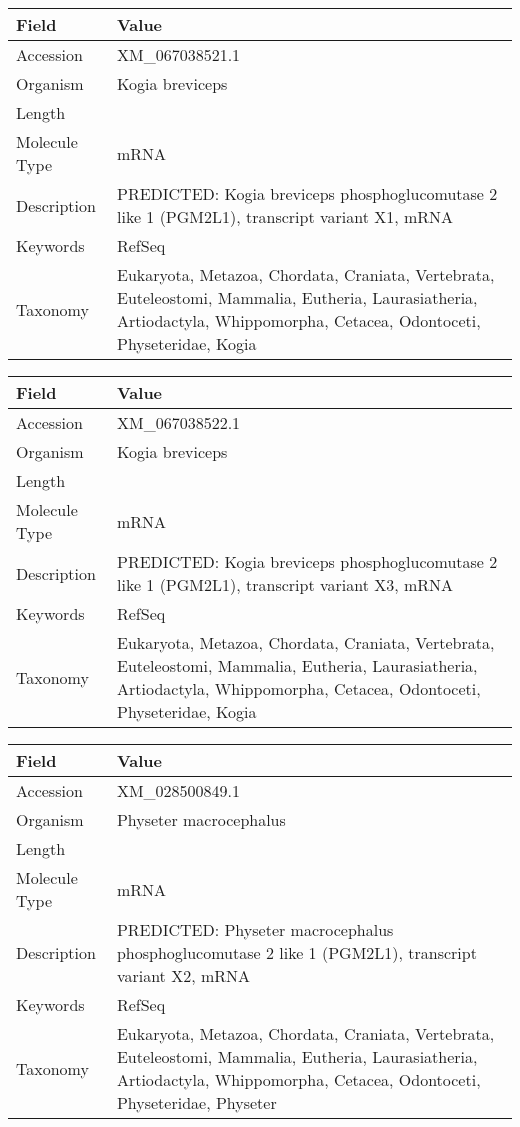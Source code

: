 \documentclass[10pt]{article}
\begin{document}
{\footnotesize
\begin{longtable}{>{\raggedright\arraybackslash}p{4.5cm} >{\raggedright\arraybackslash}p{11.5cm}}
\textbf{Field} & \textbf{Value} \\
\hline
Accession & XM\_067038521.1 \\
Organism & Kogia breviceps \\
Length & 6939 \\
Molecule Type & mRNA \\
Description & PREDICTED: Kogia breviceps phosphoglucomutase 2 like 1 (PGM2L1), transcript variant X1, mRNA \\
Keywords & RefSeq \\
Taxonomy & Eukaryota, Metazoa, Chordata, Craniata, Vertebrata, Euteleostomi, Mammalia, Eutheria, Laurasiatheria, Artiodactyla, Whippomorpha, Cetacea, Odontoceti, Physeteridae, Kogia \\
\end{longtable}
}

{\footnotesize
\begin{longtable}{>{\raggedright\arraybackslash}p{4.5cm} >{\raggedright\arraybackslash}p{11.5cm}}
\textbf{Field} & \textbf{Value} \\
\hline
Accession & XM\_067038522.1 \\
Organism & Kogia breviceps \\
Length & 7088 \\
Molecule Type & mRNA \\
Description & PREDICTED: Kogia breviceps phosphoglucomutase 2 like 1 (PGM2L1), transcript variant X3, mRNA \\
Keywords & RefSeq \\
Taxonomy & Eukaryota, Metazoa, Chordata, Craniata, Vertebrata, Euteleostomi, Mammalia, Eutheria, Laurasiatheria, Artiodactyla, Whippomorpha, Cetacea, Odontoceti, Physeteridae, Kogia \\
\end{longtable}
}

{\footnotesize
\begin{longtable}{>{\raggedright\arraybackslash}p{4.5cm} >{\raggedright\arraybackslash}p{11.5cm}}
\textbf{Field} & \textbf{Value} \\
\hline
Accession & XM\_028500849.1 \\
Organism & Physeter macrocephalus \\
Length & 2159 \\
Molecule Type & mRNA \\
Description & PREDICTED: Physeter macrocephalus phosphoglucomutase 2 like 1 (PGM2L1), transcript variant X2, mRNA \\
Keywords & RefSeq \\
Taxonomy & Eukaryota, Metazoa, Chordata, Craniata, Vertebrata, Euteleostomi, Mammalia, Eutheria, Laurasiatheria, Artiodactyla, Whippomorpha, Cetacea, Odontoceti, Physeteridae, Physeter \\
\end{longtable}
}
\end{document}
